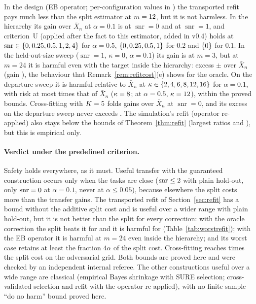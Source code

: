 \documentclass[10pt,a4paper]{article}
\theoremstyle{plain}
\theoremstyle{definition}
\theoremstyle{remark}
\DeclareMathOperator{\snr}{snr}
\begin{document}
In the design (EB operator; per-configuration values in ) the transported refit pays much less than the split estimator at $m=12$, but it is not harmless. In the hierarchy its gain over $\bar X_n$ at $\alpha=0.1$ is \SZeroTrTenGain{} at $\snr=0$ and \SOneTrTenGain{} at $\snr=1$, and criterion~U (applied after the fact to this estimator, added in v0.4) holds at $\snr\in\{\UsefulTrHalf\}$ for $\alpha=0.5$, $\{0, 0.25, 0.5, 1\}$ for $0.2$ and $\{0\}$ for $0.1$. In the held-out-size sweep ($\snr=1$, $\kappa=0$, $\alpha=0.1$) its gain is \MThreeZeroTrGain{} at $m=3$, but at $m=24$ it is harmful even with the target inside the hierarchy: excess \MTwentyFourZeroTrExcess{} $\pm$ \MTwentyFourZeroTrExcessSE{} over $\bar X_n$ (gain \MTwentyFourZeroTrGain), the behaviour that Remark~\ref{rem:refitcost}(e) shows for the oracle. On the departure sweep it is harmful relative to $\bar X_n$ at $\kappa\in\{2, 4, 6, 8, 12, 16\}$ for $\alpha=0.1$, with risk at most \DepTrTenMax{} times that of $\bar X_n$ ($\kappa=8$; \DepTrHalfMax{} at $\alpha=0.5$, $\kappa=12$), within the proved bounds. Cross-fitting with $K=5$ folds gains \RfCfSZeroGain{} over $\bar X_n$ at $\snr=0$, and its excess on the departure sweep never exceeds \RfCfDepMax. The simulation's refit (operator re-applied) also stays below the bounds of Theorem~\ref{thm:refit} (largest ratios \RfSimMaxB{} and \RfSimMaxCap), but this is empirical only.

\paragraph{Verdict under the predefined criterion.}
Safety holds everywhere, as it must. Useful transfer with the guaranteed construction occurs only when the tasks are close ($\snr\le\UsefulRevMaxHalf$ with plain hold-out, only $\snr=\UsefulRevMaxTen$ at $\alpha=0.1$, never at $\alpha\le0.05$), because elsewhere the split costs more than the transfer gains. The transported refit of Section~\ref{sec:refit} has a bound without the additive split cost and is useful over a wider range with plain hold-out, but it is not better than the split for every correction: with the oracle correction the split beats it for \RfOraSplitBetterText{} and it is harmful for \RfOraHarmText{} (Table~\ref{tab:worstrefit}); with the EB operator it is harmful at $m=24$ even inside the hierarchy; and its worst case retains at least the fraction $4\alpha$ of the split cost. Cross-fitting reaches \RfAcfMaxSplit{} times the split cost on the adversarial grid. Both bounds are proved here and were checked by an independent internal referee. The other constructions useful over a wide range are classical (empirical Bayes shrinkage with SURE selection; cross-validated selection and refit with the operator re-applied), with no finite-sample ``do no harm'' bound proved here.
\end{document}
